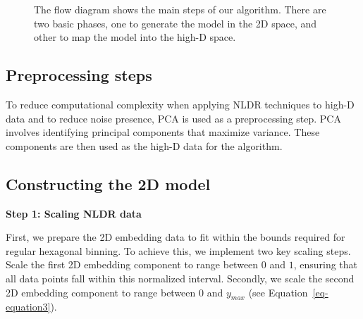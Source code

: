 \documentclass[
  12pt]{article}
\begin{document}
\begin{figure}


\caption{\label{fig-meth}The flow diagram shows the main steps of our
algorithm. There are two basic phases, one to generate the model in the
2D space, and other to map the model into the high-D space.}

\end{figure}%

\subsection{Preprocessing steps}\label{preprocessing-steps}

To reduce computational complexity when applying NLDR techniques to
high-D data and to reduce noise presence, PCA \citep[\citet{article68},
\citet{article69}]{article67} is used as a preprocessing step. PCA
involves identifying principal components that maximize variance. These
components are then used as the high-D data for the algorithm.

\subsection{Constructing the 2D model}\label{sec-construct2d}

\textbf{Step 1: Scaling NLDR data}

First, we prepare the 2D embedding data to fit within the bounds
required for regular hexagonal binning. To achieve this, we implement
two key scaling steps. Scale the first 2D embedding component to range
between \(0\) and \(1\), ensuring that all data points fall within this
normalized interval. Secondly, we scale the second 2D embedding
component to range between \(0\) and \(y_{max}\) (see
Equation~\ref{eq-equation3}).
\end{document}
